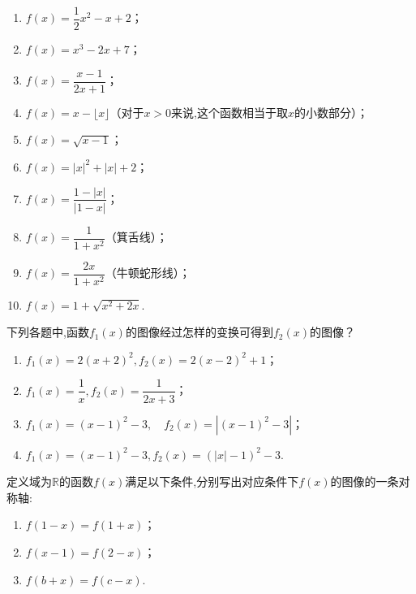 \documentclass[lang=cn,math=cm,chinesefont=nofont,11pt,scheme=chinese,twocol]{elegantbook}
\begin{document}
\begin{spacing}{1.8}
  \begin{enumerate}\label{exer:FunctionGraph}
    \item $f(x)=\dfrac12 x^2-x+2$；
    \item $f(x)=x^3-2x+7$；
    \item $f(x)=\dfrac{x-1}{2x+1}$；
    \item $f(x)=x-\lfloor x\rfloor$（对于$x>0$来说,这个函数相当于取$x$的小数部分）；
    \item $f(x)=\sqrt{x-1}$；
    \item $f(x)=\left|x\right|^2+\left|x\right|+2$；
    \item $f(x)=\dfrac{1-\left|x\right|}{\left|1-x\right|}$；
    \item $f(x)=\dfrac{1}{1+x^2}$（箕舌线）；
    \item $f(x)=\dfrac{2x}{1+x^2}$（牛顿蛇形线）；
    \item $f(x)=1+\sqrt{x^{2}+2x}$.
  \end{enumerate}
\end{spacing}

\begin{exercise}\label{BJSZ.Algebra1.P58-59.changed}
  下列各题中,函数$f_1(x)$的图像经过怎样的变换可得到$f_2(x)$的图像？
\end{exercise}

\begin{spacing}{1.7}
  \begin{enumerate}
    \item $f_{1}(x)=2(x+2)^{2}, f_{2}(x)=2(x-2)^{2}+1$；
    \item $f_{1}(x)=\dfrac{1}{x}, f_{2}(x)=\dfrac{1}{2x+3}$；
    \item $f_{1}\left(x\right)=\left(x-1\right)^{2}-3,\quad f_{2}\left(x\right)=\left|\left(x-1\right)^{2}-3\right|$；
    \item $f_{1}(x)=(x-1)^{2}-3,f_{2}(x)=(|x|-1)^{2}-3$.
  \end{enumerate}
\end{spacing}

\begin{exercise}
  定义域为$\mathbb{R}$的函数$f(x)$满足以下条件,分别写出对应条件下$f(x)$的图像的一条对称轴:
\end{exercise}

\begin{enumerate}
  \item $f(1-x)=f(1+x)$；
  \item $f(x-1)=f(2-x)$；
  \item $f(b+x)=f(c-x)$.
\end{enumerate}
\end{document}
